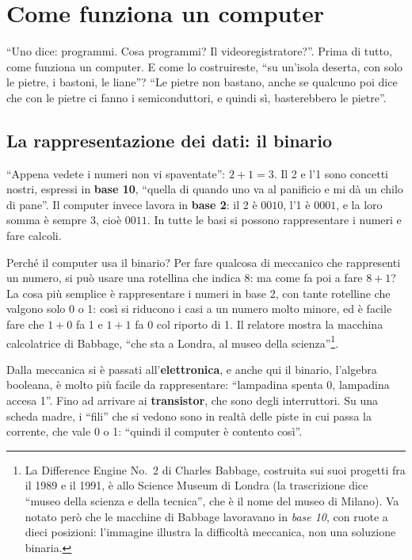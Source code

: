 \section{Come funziona un computer}
\label{p5:sec:computer}

``Uno dice: programmi. Cosa programmi? Il videoregistratore?''. Prima di
tutto, come funziona un computer. E come lo costruireste, ``su un'isola
deserta, con solo le pietre, i bastoni, le liane''? ``Le pietre non bastano,
anche se qualcuno poi dice che con le pietre ci fanno i semiconduttori, e
quindi sì, basterebbero le pietre''.

\subsection{La rappresentazione dei dati: il binario}

``Appena vedete i numeri non vi spaventate'': $2+1=3$. Il 2 e l'1 sono
concetti nostri, espressi in \textbf{base 10}, ``quella di quando uno va al
panificio e mi dà un chilo di pane''. Il computer invece lavora in
\textbf{base 2}: il 2 è $0010$, l'1 è $0001$, e la loro somma è sempre 3,
cioè $0011$. In tutte le basi si possono rappresentare i numeri e fare
calcoli.

Perché il computer usa il binario? Per fare qualcosa di meccanico che
rappresenti un numero, si può usare una rotellina che indica 8: ma come fa poi
a fare $8+1$? La cosa più semplice è rappresentare i numeri in base 2, con
tante rotelline che valgono solo 0 o 1: così si riducono i casi a un numero
molto minore, ed è facile fare che $1+0$ fa 1 e $1+1$ fa 0 col riporto di 1.
Il relatore mostra la macchina calcolatrice di Babbage, ``che sta a Londra, al
museo della scienza''\footnote{La Difference Engine No.~2 di Charles Babbage,
costruita sui suoi progetti fra il 1989 e il 1991, è allo Science Museum di
Londra (la trascrizione dice ``museo della scienza e della tecnica'', che è il
nome del museo di Milano). Va notato però che le macchine di Babbage
lavoravano in \emph{base 10}, con ruote a dieci posizioni: l'immagine illustra
la difficoltà meccanica, non una soluzione binaria.}.

Dalla meccanica si è passati all'\textbf{elettronica}, e anche qui il binario,
l'algebra booleana, è molto più facile da rappresentare: ``lampadina spenta 0,
lampadina accesa 1''. Fino ad arrivare ai \textbf{transistor}, che sono degli
interruttori. Su una scheda madre, i ``fili'' che si vedono sono in realtà
delle piste in cui passa la corrente, che vale 0 o 1: ``quindi il computer è
contento così''.

